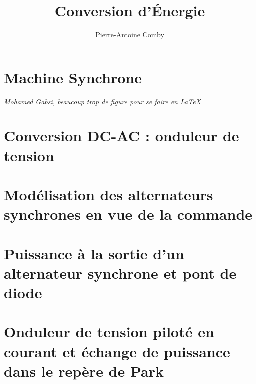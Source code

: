 \documentclass{../../cours}
\author{Pierre-Antoine Comby}
\title{Conversion d'Énergie}
\begin{document}
\maketitle
\tableofcontents
\chapter{Machine Synchrone}
\emph{Mohamed Gabsi, beaucoup trop de figure pour se faire en \LaTeX}
\chapter{Conversion DC-AC : onduleur de tension}

\chapter{Modélisation des alternateurs synchrones en vue de la commande}

\chapter{Puissance à la sortie d'un alternateur synchrone et pont de diode}
%
\chapter{Onduleur de tension piloté en courant et échange de puissance dans le repère de Park}
\end{document}
